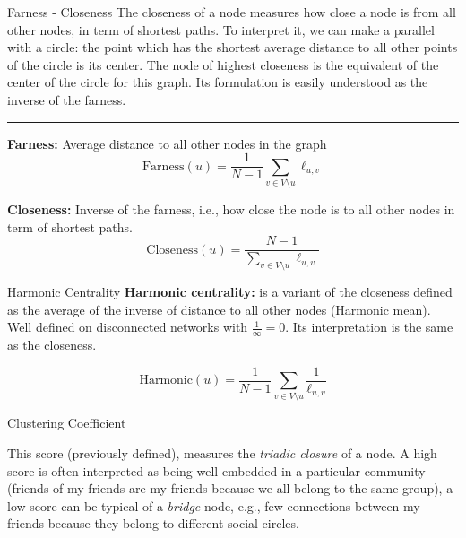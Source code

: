 \documentclass[a4paper,11pt]{book}
\begin{document}
\begin{textbox}{Farness - Closeness}
The closeness of a node measures how close a node is from all other nodes, in term of shortest paths. To interpret it, we can make a parallel with a circle: the point which has the shortest average distance to all other points of the circle is its center. The node of highest closeness is the equivalent of the center of the circle for this graph. Its formulation is easily understood as the inverse of the farness.

\noindent\rule{4cm}{0.1pt}

\textbf{Farness:} Average distance to all other nodes in the graph
\[\text{Farness}(u)=\frac{1}{N-1}\sum_{v \in V \setminus u}\ell_{u,v} \]

\textbf{Closeness:} Inverse of the farness, i.e., how close the node is to all other nodes in term of shortest paths. 
\[\text{Closeness}(u)=\frac{N-1}{\sum_{v \in V \setminus u}\ell_{u,v}} \]


\end{textbox}



\begin{textbox}{Harmonic Centrality}
\textbf{Harmonic centrality:} is a variant of the closeness defined as the average of the inverse of distance to all other nodes (Harmonic mean). Well defined on disconnected networks with $\frac{1}{\infty}=0$. Its interpretation is the same as the closeness.

\[\text{Harmonic}(u)=\frac{1}{N-1} \sum_{v \in V \setminus u} \frac{1}{\ell_{u,v}} \]

\end{textbox}

















\begin{textbox}{Clustering Coefficient}

This score (previously defined), measures the \textit{triadic closure} of a node. A high score is often interpreted as being well embedded in a particular community (friends of my friends are my friends because we all belong to the same group), a low score can be typical of a \textit{bridge} node, e.g., few connections between my friends because they belong to different social circles.
\end{textbox}
\end{document}
